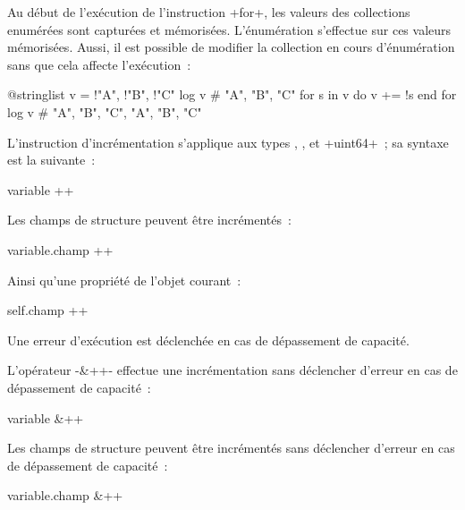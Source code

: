Au début de l'exécution de l'instruction \ggst+for+, les valeurs des collections enumérées sont capturées et mémorisées. L'énumération s'effectue sur ces valeurs mémorisées. Aussi, il est possible de modifier la collection en cours d'énumération sans que cela affecte l'exécution~:
\begin{galgas3}
@stringlist v = {!"A", !"B", !"C"}
log v # "A", "B", "C"
for s in v do
  v += !s
end for
log v # "A", "B", "C", "A", "B", "C"
\end{galgas3}





















L'instruction d'incrémentation s'applique aux types  ,  ,  et \ggst+uint64+~; sa syntaxe est la suivante~:

\begin{galgas3box}
variable ++
\end{galgas3box}

Les champs de structure peuvent être incrémentés~:
\begin{galgas3box}
variable.champ ++
\end{galgas3box}


Ainsi qu'une propriété de l'objet courant~:
\begin{galgas3box}
self.champ ++
\end{galgas3box}

Une erreur d'exécution est déclenchée en cas de dépassement de capacité.

L'opérateur \ggst-&++- effectue une incrémentation sans déclencher d'erreur en cas de dépassement de capacité~:
\begin{galgas3box}
variable &++
\end{galgas3box}

Les champs de structure peuvent être incrémentés sans déclencher d'erreur en cas de dépassement de capacité~:
\begin{galgas3box}
variable.champ &++
\end{galgas3box}








